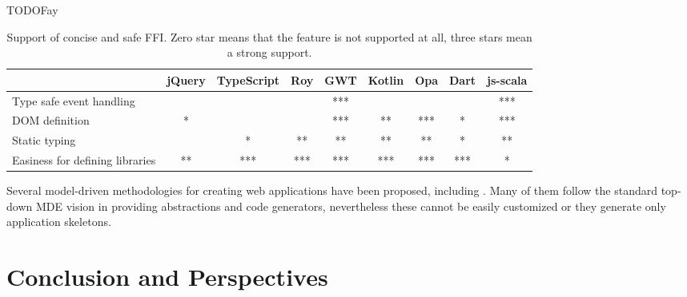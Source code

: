 \documentclass[runningheads,a4paper]{llncs}
\begin{document}
TODO{Fay}

\begin{table}
\centering
\begin{tabular}{| l | c | c | c | c | c | c | c | c |}
\hline
& jQuery & TypeScript & Roy & GWT & Kotlin & Opa & Dart & js-scala \\
\hline
Type safe event handling & & & & *** & & & & *** \\
\hline
DOM definition & * & & & *** & ** & *** & * & *** \\
\hline
Static typing & & * & ** & ** & ** & ** & * & ** \\
\hline
Easiness for defining libraries & ** & *** & *** & *** & *** & *** & *** & * \\
\hline
\end{tabular}
\caption{Support of concise and safe FFI. Zero star means that the feature is not supported
at all, three stars mean a strong support.}
\label{comparison}
\end{table}

Several model-driven methodologies for creating web applications have been proposed, including
\cite{schwabe1996systematic,lima2003modeling,ceri2000web,koch2001authoring,pastor2003oows,valverde2007mda,vdovjak2003engineering,kraus2007model,nunes2006rapid,brambilla2008designing,valderas2007transformational,van2006hera,Groenewegen08_WebDSL}.
Many of them follow the standard top-down MDE vision in providing abstractions and code generators, nevertheless
these cannot be easily customized or they generate only application skeletons.



\section{Conclusion and Perspectives}




\end{document}
